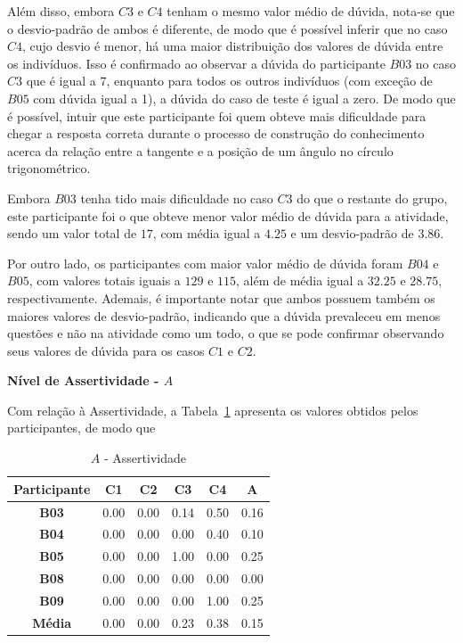 Além disso, embora $C3$ e $C4$ tenham o mesmo valor médio de dúvida, nota-se que o desvio-padrão de ambos é diferente, de modo que é possível inferir que no caso $C4$, cujo desvio é menor, há uma maior distribuição dos valores de dúvida entre os indivíduos. Isso é confirmado ao observar a dúvida do participante $B03$ no caso $C3$ que é igual a $7$, enquanto para todos os outros indivíduos (com exceção de $B05$ com dúvida igual a 1), a dúvida do caso de teste é igual a zero. De modo que é possível, intuir que este participante foi quem obteve mais dificuldade para chegar a resposta correta durante o processo de construção do conhecimento acerca da relação entre a tangente e a posição de um ângulo no círculo trigonométrico.

Embora $B03$ tenha tido mais dificuldade no caso $C3$ do que o restante do grupo, este participante foi o que obteve menor valor médio de dúvida para a atividade, sendo um valor total de $17$, com média igual a $4.25$ e um desvio-padrão de $3.86$. 

Por outro lado, os participantes com maior valor médio de dúvida foram $B04$ e $B05$, com valores totais iguais a $129$ e $115$, além de média igual a $32.25$ e $28.75$, respectivamente. Ademais, é importante notar que ambos possuem também os maiores valores de desvio-padrão, indicando que a dúvida prevaleceu em menos questões e não na atividade como um todo, o que se pode confirmar observando seus valores de dúvida para os casos $C1$ e $C2$.

\textbf{Nível de Assertividade - $A$}

Com relação à Assertividade, a Tabela~\ref{tab:F3_A5_A} apresenta os valores obtidos pelos participantes, de modo que

\begin{table}[htbp]
	\centering
	\caption{$A$ - Assertividade}
	\begin{tabular}{|c|c|c|c|c|c|}
		\hline
		\rowcolor[HTML]{D9D9D9} 
		\textbf{Participante} & \textbf{C1} & \textbf{C2} & \textbf{C3} & \textbf{C4} & \textbf{A} \\ \hline
		\rowcolor[HTML]{FFFFFF} 
		\textbf{B03} & 0.00 & 0.00 & 0.14 & 0.50 & 0.16 \\ \hline
		\rowcolor[HTML]{E7E6E6} 
		\textbf{B04} & 0.00 & 0.00 & 0.00 & 0.40 & 0.10 \\ \hline
		\rowcolor[HTML]{FFFFFF} 
		\textbf{B05} & 0.00 & 0.00 & 1.00 & 0.00 & 0.25 \\ \hline
		\rowcolor[HTML]{E7E6E6} 
		\textbf{B08} & 0.00 & 0.00 & 0.00 & 0.00 & 0.00 \\ \hline
		\rowcolor[HTML]{FFFFFF} 
		\textbf{B09} & 0.00 & 0.00 & 0.00 & 1.00 & 0.25 \\ \hline
		\rowcolor[HTML]{D0CECE} 
		\textbf{Média} & 0.00 & 0.00 & 0.23 & 0.38 & 0.15 \\ \hline
	\end{tabular}
	\label{tab:F3_A5_A}
\end{table}

